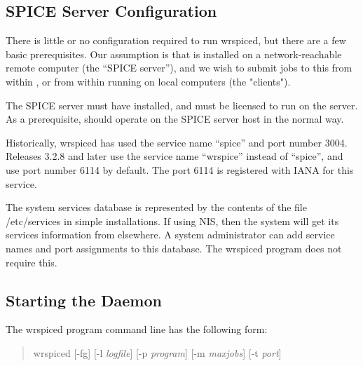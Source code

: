 \subsection{SPICE Server Configuration}

There is little or no configuration required to run {\vt wrspiced},
but there are a few basic prerequisites.  Our assumption is that
{\WRspice} is installed on a network-reachable remote computer (the
``SPICE server''), and we wish to submit jobs to this {\WRspice} from
within {\Xic}, or from within {\WRspice} running on local computers
(the "clients").

The SPICE server must have {\WRspice} installed, and {\WRspice} must
be licensed to run on the server.
As a prerequisite, {\WRspice} should operate on the
SPICE server host in the normal way.

Historically, {\vt wrspiced} has used the service name ``{\vt spice}''
and port number 3004.  Releases 3.2.8 and later use the service name
``{\vt wrspice}'' instead of ``{\vt spice}'', and use port number 6114
by default.  The port 6114 is registered with IANA for this service.

The system services database is represented by the contents of the
file {\vt /etc/services} in simple installations.  If using NIS, then
the system will get its services information from elsewhere.  A system
administrator can add service names and port assignments to this
database.  The {\vt wrspiced} program does not require this.

\subsection{Starting the Daemon}

The {\vt wrspiced} program command line has the following form:

\begin{quote}
{\vt wrspiced} [{\vt -fg}] [{\vt -l} {\it logfile\/}]
  [{\vt -p} {\it program\/}] [{\vt -m} {\it maxjobs\/}] [{\vt -t} {\it port\/}]
\end{quote}

